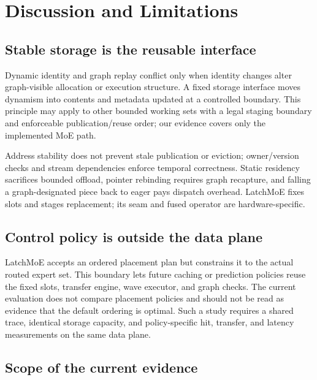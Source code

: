 \section{Discussion and Limitations}
\label{sec:discussion}

\subsection{Stable storage is the reusable interface}

Dynamic identity and graph replay conflict only when identity changes alter
graph-visible allocation or execution structure. A fixed storage interface
moves dynamism into contents and metadata updated at a controlled boundary.
This principle may apply to other bounded working sets with a legal staging
boundary and enforceable publication/reuse order; our evidence covers only the
implemented MoE path.

Address stability does not prevent stale publication or eviction; owner/version
checks and stream dependencies enforce temporal correctness. Static residency
sacrifices bounded offload, pointer rebinding requires graph recapture, and
falling a graph-designated piece back to eager pays dispatch overhead. LatchMoE
fixes slots and stages replacement; its seam and fused operator are
hardware-specific.

\subsection{Control policy is outside the data plane}

LatchMoE accepts an ordered placement plan but constrains it to the actual
routed expert set. This boundary lets future caching or prediction policies
reuse the fixed slots, transfer engine, wave executor, and graph checks. The
current evaluation does not compare placement policies and should not be read
as evidence that the default ordering is optimal. Such a study requires a
shared trace, identical storage capacity, and policy-specific hit, transfer,
and latency measurements on the same data plane.

\subsection{Scope of the current evidence}

